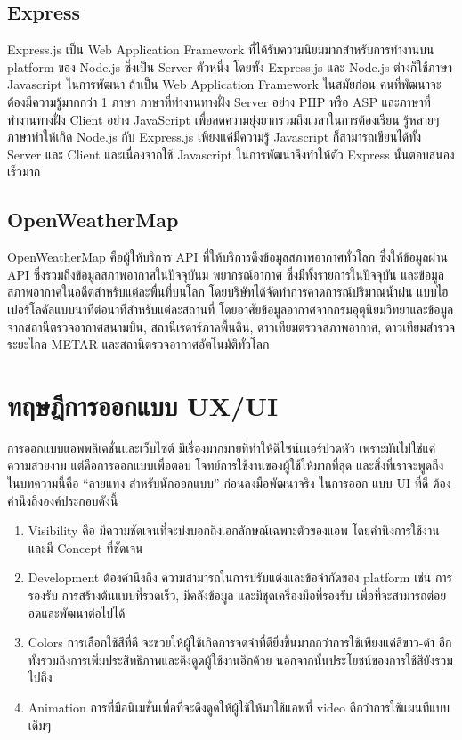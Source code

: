 \subsection{Express}
Express.js เป็น Web Application Framework ที่ได้รับความนิยมมากสำหรับการทำงานบน platform ของ Node.js
ซึ่งเป็น Server ตัวหนึ่ง โดยทั้ง Express.js และ Node.js ต่างก็ใช้ภาษา Javascript ในการพัฒนา ถ้าเป็น Web
Application Framework ในสมัยก่อน คนที่พัฒนาจะต้องมีความรู้มากกว่า 1 ภาษา ภาษาที่ทำงานทางฝั่ง Server อย่าง PHP
หรือ ASP และภาษาที่ทำงานทางฝั่ง Client อย่าง JavaScript เพื่อลดความยุ่งยากรวมถึงเวลาในการต้องเรียน รู้หลายๆ ภาษาทำให้เกิด
Node.js กับ Express.js เพียงแค่มีความรู้ Javascript ก็สามารถเขียนได้ทั้ง Server และ Client และเนื่องจากใช้
Javascript ในการพัฒนาจึงทำให้ตัว Express นั้นตอบสนองเร็วมาก~\cite{express-doc}

\subsection{OpenWeatherMap}
OpenWeatherMap คือผู้ให้บริการ API ที่ให้บริการดึงข้อมูลสภาพอากาศทั่วโลก ซึ่งให้ข้อมูลผ่าน API ซึ่งรวมถึงข้อมูลสภาพอากาศในปัจจุบันม
พยากรณ์อากาศ ซึ่งมีทั้งรายการในปัจจุบัน และข้อมูลสภาพอากาศในอดีตสำหรับแต่ละพื่นที่บนโลก โดยบริษัทได้จัดทำการคาดการณ์ปริมาณน้ำฝน
แบบไฮเปอร์โลคัลแบบนาทีต่อนาทีสำหรับแต่ละสถานที่ โดยอาศัยข้อมูลอากาศจากกรมอุตุนิยมวิทยาและข้อมูลจากสถานีตรวจอากาศสนามบิน,
สถานีเรดาร์ภาคพื้นดิน, ดาวเทียมตรวจสภาพอากาศ, ดาวเทียมสำรวจระยะไกล METAR และสถานีตรวจอากาศอัตโนมัติทั่วโลก~\cite{openweather-doc}


\section{ทฤษฎีการออกแบบ UX/UI}
การออกแบบแอพพลิเคชั่นและเว็บไซต์ มีเรื่องมากมายที่ทำให้ดีไซน์เนอร์ปวดหัว เพราะมันไม่ใช่แค่ความสวยงาม แต่คือการออกแบบเพื่อตอบ
โจทย์การใช้งานของผู้ใช้ให้มากที่สุด และสิ่งที่เราจะพูดถึงในบทความนี้คือ “ลายแทง สำหรับนักออกแบบ” ก่อนลงมือพัฒนาจริง ในการออก
แบบ UI ที่ดี ต้องคำนึงถึงองค์ประกอบดังนี้
\begin{enumerate}
  \item Visibility คือ มีความชัดเจนที่จะบ่งบอกถึงเอกลักษณ์เฉพาะตัวของแอพ โดยคำนึงการใช้งาน และมี Concept ที่ชัดเจน
  \item Development ต้องคำนึงถึง ความสามารถในการปรับแต่งและข้อจำกัดของ platform เช่น การรองรับ การสร้างต้นแบบที่รวดเร็ว, มีคลังข้อมูล และมีชุดเครื่องมือที่รองรับ เพื่อที่จะสามารถต่อยอดและพัฒนาต่อไปได้
  \item Colors การเลือกใช้สีที่ดี จะช่วยให้ผู้ใช้เกิดการจดจำที่ดียิ่งขึ้นมากกว่าการใช้เพียงแค่สีขาว-ดำ อีกทั้งรวมถึงการเพิ่มประสิทธิภาพและดึงดูดผู้ใช้งานอีกด้วย นอกจากนั้นประโยชน์ของการใช้สียังรวมไปถึง
  \item Animation การที่มีอนิเมชั่นเพื่อที่จะดึงดูดให้ผู้ใช้ให้มาใช้แอพที่ video ดีกว่าการใช้แผนทีแบบเดิมๆ
\end{enumerate}

